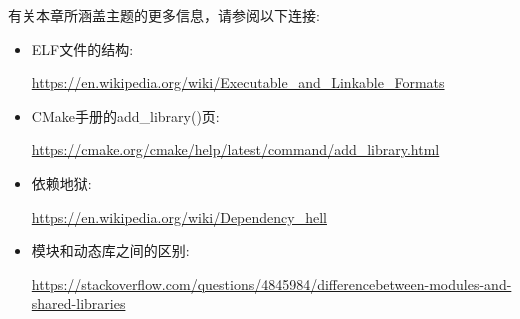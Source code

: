 
有关本章所涵盖主题的更多信息，请参阅以下连接:

\begin{itemize}
\item 
ELF文件的结构:

\url{https://en.wikipedia.org/wiki/Executable\_and\_Linkable\_Formats}

\item 
CMake手册的add\_library()页:

\url{https://cmake.org/cmake/help/latest/command/add\_library.html}

\item 
依赖地狱:

\url{https://en.wikipedia.org/wiki/Dependency\_hell}

\item 
模块和动态库之间的区别:

\url{https://stackoverflow.com/questions/4845984/differencebetween-modules-and-shared-libraries}
\end{itemize}